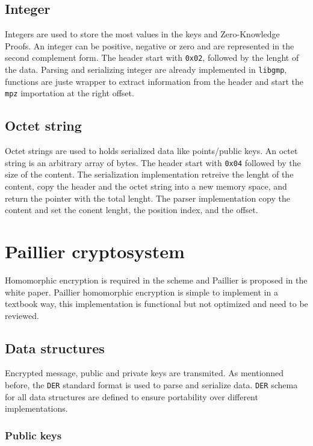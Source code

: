 \subsection{Integer}

Integers are used to store the most values in the keys and Zero-Knowledge Proofs.
An integer can be positive, negative or zero and are represented in the second
complement form. The header start with \texttt{0x02}, followed by the lenght of the data.
Parsing and serializing integer are already implemented in \texttt{libgmp}, functions are
juste wrapper to extract information from the header and start the \texttt{mpz}
importation at the right offset.

\subsection{Octet string}

Octet strings are used to holds serialized data like points/public keys.
An octet string is an arbitrary array of bytes. The header start with \texttt{0x04}
followed by the size of the content. The serialization implementation retreive
the lenght of the content, copy the header and the octet string into a new memory
space, and return the pointer with the total lenght. The parser implementation
copy the content and set the conent lenght, the position index, and the offset.


\section{Paillier cryptosystem}

Homomorphic encryption is required in the scheme and Paillier is proposed in the
white paper. Paillier homomorphic encryption is simple to implement in a textbook
way, this implementation is functional but not optimized and need to be reviewed.

\subsection{Data structures}

Encrypted message, public and private keys are transmited. As mentionned before,
the \texttt{DER} standard format is used to parse and serialize data. \texttt{DER} schema for all
data structures are defined to ensure portability over different implementations.

\subsubsection{Public keys}

